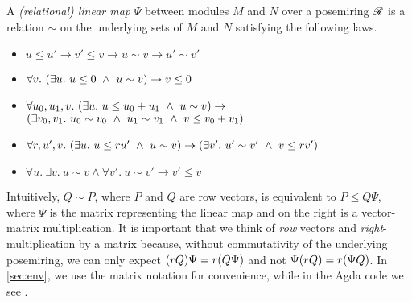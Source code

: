 \begin{definition}
  A \emph{(relational) linear map} $\Psi$ between modules $M$ and $N$ over a
  posemiring $\mathscr R$ is a relation $\sim$ on the underlying sets of $M$ and $N$
  satisfying the following laws.
  \begin{itemize}
    \item $u \leq u' \to v' \leq v \to u \sim v \to u' \sim v'$
    \item $\forall v.~\plr{\exists u.~u \leq 0 \land u \sim v} \to v \leq 0$
    \item $\forall u_0,u_1,v.~\plr{\exists u.~u \leq u_0 + u_1 \land u \sim v}
      \to {}$\\$\plr{\exists v_0,v_1.~u_0 \sim v_0
      \land u_1 \sim v_1 \land v \leq v_0 + v_1}$
    \item $\forall r,u',v.~\plr{\exists u.~u \leq ru' \land u \sim v} \to
      \plr{\exists v'.~u' \sim v' \land v \leq rv'}$
    \item
      $\forall u.~\exists v.~u \sim v \land \forall v'.~u \sim v' \to v' \leq v$
  \end{itemize}
\end{definition}

Intuitively, $Q \sim P$, where $P$ and $Q$ are row vectors, is equivalent to
$P \leq Q\Psi$, where $\Psi$ is the matrix representing the linear map and on
the right is a vector-matrix multiplication.
It is important that we think of \emph{row} vectors and
\emph{right}-multiplication by a matrix because, without commutativity of the
underlying posemiring, we can only expect $\plr{rQ}\Psi = r\plr{Q\Psi}$ and
not $\Psi\plr{rQ} = r\plr{\Psi Q}$.
In \cref{sec:env}, we use the matrix notation for convenience, while in the
Agda code we see .

